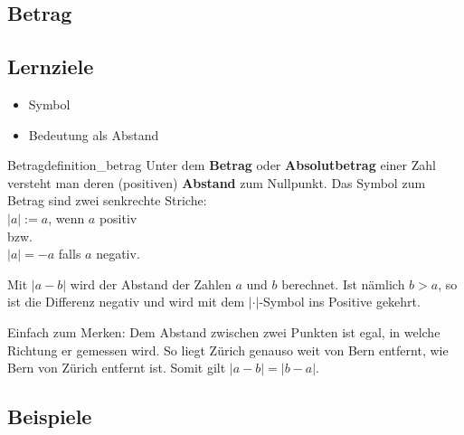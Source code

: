 
\subsection{Betrag}

%
\subsection*{Lernziele}

\begin{itemize}
  \item Symbol
  \item Bedeutung als Abstand
\end{itemize}


\begin{definition}{Betrag}{definition_betrag}
  Unter dem \textbf{Betrag} oder \textbf{Absolutbetrag} einer Zahl versteht man deren (positiven)
  \textbf{Abstand} zum Nullpunkt. Das Symbol zum Betrag sind zwei
  senkrechte Striche:\\
  $|a| := a$, wenn $a$ positiv\\
  bzw.\\
  $|a| = -a$ falls $a$ negativ.
\end{definition}

\begin{bemerkung}{}{}
Mit $|a - b|$ wird der Abstand der Zahlen $a$ und $b$ berechnet. Ist
nämlich $b > a$, so ist die Differenz negativ und wird mit dem
$| \cdot{} |$-Symbol ins Positive gekehrt.
\end{bemerkung}

\begin{bemerkung}
  Einfach zum Merken: Dem Abstand zwischen zwei Punkten ist egal, in
  welche Richtung er gemessen wird. So liegt Zürich genauso weit von
  Bern entfernt, wie Bern von Zürich entfernt ist. Somit gilt $|a - b| = |b - a|$.
\end{bemerkung}
\newpage


\subsection{Beispiele}


